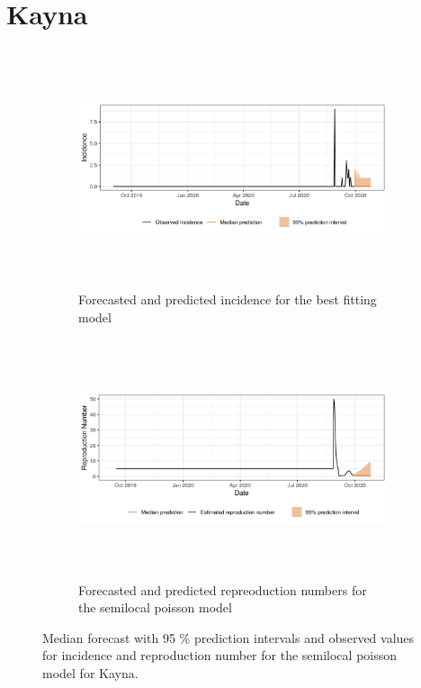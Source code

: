  \section{ Kayna }\begin{figure}[H]\begin{subfigure}{\textwidth}  \centering  \includegraphics[width=0.9\linewidth, height=7cm]{../output/Kayna_predictions.png}  \caption{Forecasted and predicted incidence for the best fitting model}\end{subfigure}

\begin{subfigure}{\textwidth}  \centering  \includegraphics[width=0.9\linewidth, height=7cm]{../output/Kayna_Rs.png}  \caption{Forecasted and predicted repreoduction numbers for the semilocal poisson model}\end{subfigure}  \caption{Median forecast with 95 \% prediction intervals and observed values for incidence and reproduction number for the semilocal poisson model for Kayna.}\end{figure}

